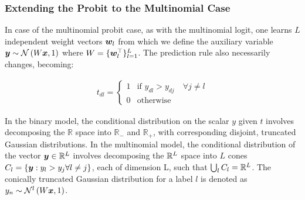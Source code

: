 

\subsubsection*{Extending the Probit to the Multinomial Case}
In case of the multinomial probit case, as with the multinomial logit, one learns $L$ independent weight vectors $\bm w_l$ from which we define the auxiliary variable $\bm y \sim \mathcal{N} \left( {W\bm x}, {1} \right)$ where $W = \{ \bm w_l^\top \}_{l=1}^L$. The prediction rule also necessarily changes, becoming:

\begin{align}
t_{dl} = \left\{ \begin{array}{lr} 1 & \text{if } y_{dl} > y_{dj} \quad \forall j \neq l \\ 0 & \text{otherwise} \end{array} \right.
\end{align}

In the binary model, the conditional distribution on the scalar $y$ given $t$ involves decomposing the $\mathbb{R}$ space into $\mathbb{R}_-$ and $\mathbb{R}_+$, with corresponding disjoint, truncated Gaussian distributions. In the multinomial model, the conditional distribution of the vector $\bm y \in { \mathbb{R}^{L} }$ involves decomposing the ${ \mathbb{R}^{L} }$ space into $L$ cones $C_l = \{ \bm y : y_l > y_j \forall l \neq j \}$, each of dimension L, such that $\bigcup_l C_l = { \mathbb{R}^{L} }$. The conically truncated Gaussian distribution for a label $l$ is denoted as $y_n \sim \mathcal{N}^{l}\left(W\bm x, 1\right)$. 

